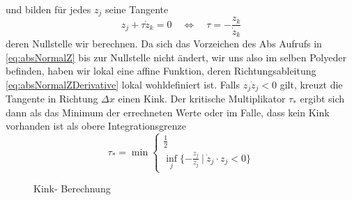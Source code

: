 und bilden für jedes $z_j$ seine Tangente
\[
 z_j + \tau \dot z_k = 0 \quad \Leftrightarrow \quad \tau =- \frac{z_k}{\dot z_k}
\]
deren Nullstelle wir berechnen. Da sich das Vorzeichen des Abs Aufrufs in \eqref{eq:absNormalZ} bis zur Nullstelle nicht ändert, wir uns also im selben Polyeder befinden, haben wir lokal eine affine Funktion, deren Richtungsableitung \eqref{eq:absNormalZDerivative} lokal wohldefiniert ist.
Falls $z_j\dot z_j <0$ gilt, kreuzt die Tangente in Richtung $\Delta x$ einen Kink.
Der kritische Multiplikator $\tau_*$ ergibt sich dann als das Minimum der errechneten Werte oder im Falle, dass kein Kink vorhanden ist als obere Integrationsgrenze
\[
 \tau_* = \min \begin{cases}
		\frac{1}{2}\\
		\inf_j\lbrace -\frac{z_j}{\dot z_j}~ \vert ~ \dot z_j \cdot z_j <0 \rbrace
	       \end{cases}
\]

\begin{figure}
\centering
 
 \caption{Kink- Berechnung}
\label{fig:findingKinks} 
\end{figure}

